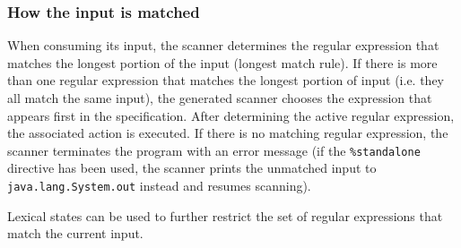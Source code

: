 \documentclass[11pt]{scrartcl}
\begin{document}
\subsubsection{How the input is matched\label{HowMatched}}
When consuming its input, the scanner determines the regular expression
that matches the longest portion of the input (longest match rule). If
there is more than one regular expression that matches the longest portion
of input (i.e. they all match the same input), the generated scanner chooses
the expression that appears first in the specification. After determining
the active regular expression, the associated action is executed. If there
is no matching regular expression, the scanner terminates the program with
an error message (if the \texttt{\%standalone} directive has been used, the
scanner prints the unmatched input to \texttt{java.lang.System.out} instead
and resumes scanning). 

Lexical states can be used to further restrict the set of regular expressions
that match the current input. 
 
\end{document}
